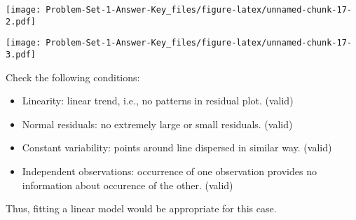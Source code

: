 \documentclass[
]{book}
\newenvironment{Shaded}{\begin{snugshade}}{\end{snugshade}}
\newcommand{\CommentTok}[1]{\textcolor[rgb]{0.56,0.35,0.01}{\textit{#1}}}
\newcommand{\DataTypeTok}[1]{\textcolor[rgb]{0.13,0.29,0.53}{#1}}
\newcommand{\KeywordTok}[1]{\textcolor[rgb]{0.13,0.29,0.53}{\textbf{#1}}}
\newcommand{\NormalTok}[1]{#1}
\newcommand{\OperatorTok}[1]{\textcolor[rgb]{0.81,0.36,0.00}{\textbf{#1}}}
\newcommand{\StringTok}[1]{\textcolor[rgb]{0.31,0.60,0.02}{#1}}
\begin{document}
\texttt{[image: Problem-Set-1-Answer-Key\_files/figure-latex/unnamed-chunk-17-2.pdf]}

\begin{Shaded}
\end{Shaded}

\texttt{[image: Problem-Set-1-Answer-Key\_files/figure-latex/unnamed-chunk-17-3.pdf]}

Check the following conditions:

\begin{itemize}
\item
  Linearity: linear trend, i.e., no patterns in residual plot. (valid)
\item
  Normal residuals: no extremely large or small residuals. (valid)
\item
  Constant variability: points around line dispersed in similar way. (valid)
\item
  Independent observations: occurrence of one observation provides no information about occurence of the other. (valid)
\end{itemize}

Thus, fitting a linear model would be appropriate for this case.

  
\end{document}
